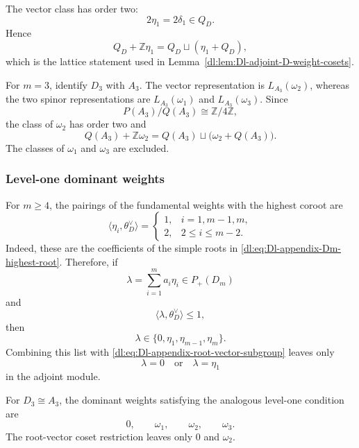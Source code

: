\documentclass[11pt,reqno]{amsart}
\theoremstyle{definition}
\theoremstyle{remark}
\begin{document}
The vector class has order two:
\begin{equation*}
  2\eta_1=2\delta_1\in Q_D.
\end{equation*}
Hence
\begin{equation}
  Q_D+\mathbb Z\eta_1
  =
  Q_D
  \sqcup
  (\eta_1+Q_D),
  \label{dl:eq:Dl-appendix-root-vector-subgroup}
\end{equation}
which is the lattice statement used in
Lemma~\ref{dl:lem:Dl-adjoint-D-weight-cosets}.

For \(m=3\), identify \(D_3\) with \(A_3\).  The vector representation
is \(L_{A_3}(\omega_2)\), whereas the two spinor representations are
\(L_{A_3}(\omega_1)\) and \(L_{A_3}(\omega_3)\).  Since
\begin{equation*}
  P(A_3)/Q(A_3)\cong\mathbb Z/4\mathbb Z,
\end{equation*}
the class of \(\omega_2\) has order two and
\begin{equation*}
  Q(A_3)+\mathbb Z\omega_2
  =
  Q(A_3)
  \sqcup
  \bigl(\omega_2+Q(A_3)\bigr).
\end{equation*}
The classes of \(\omega_1\) and \(\omega_3\) are excluded.

\subsubsection{Level-one dominant weights}


For \(m\ge4\), the pairings of the fundamental weights with the
highest coroot are
\begin{equation*}
  \langle\eta_i,\theta_D^\vee\rangle
  =
  \begin{cases}
    1,&i=1,m-1,m,\\
    2,&2\le i\le m-2.
  \end{cases}
\end{equation*}
Indeed, these are the coefficients of the simple roots in
\eqref{dl:eq:Dl-appendix-Dm-highest-root}.  Therefore, if
\[
  \lambda=\sum_{i=1}^{m}a_i\eta_i
  \in P_+(D_m)
\]
and
\[
  \langle\lambda,\theta_D^\vee\rangle\le1,
\]
then
\begin{equation*}
  \lambda
  \in
  \{0,\eta_1,\eta_{m-1},\eta_m\}.
\end{equation*}
Combining this list with
\eqref{dl:eq:Dl-appendix-root-vector-subgroup} leaves only
\begin{equation*}
  \lambda=0
  \quad\text{or}\quad
  \lambda=\eta_1
\end{equation*}
in the adjoint module.

For \(D_3\cong A_3\), the dominant weights satisfying the analogous
level-one condition are
\begin{equation*}
  0,\qquad
  \omega_1,\qquad
  \omega_2,\qquad
  \omega_3.
\end{equation*}
The root-vector coset restriction leaves only
\(0\) and \(\omega_2\).
\end{document}
